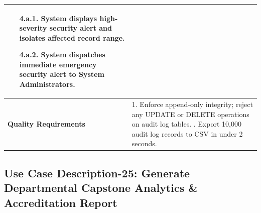 \begin{table}[H]
\begin{tabularx}{\textwidth}{|l|X|}
\begin{itemize}[leftmargin=*]
    \begin{itemize}[leftmargin=*]
        \item[4.a.1.] System displays high-severity security alert and isolates affected record range.
        \item[4.a.2.] System dispatches immediate emergency security alert to System Administrators.
    \end{itemize}
\end{itemize} \\ \hline
\textbf{Quality Requirements} & 
1. Enforce append-only integrity; reject any UPDATE or DELETE operations on audit log tables. \newline
2. Export 10,000 audit log records to CSV in under 2 seconds. \\ \hline
\end{tabularx}
\end{table}

\clearpage
\subsection{Use Case Description-25: Generate Departmental Capstone Analytics \& Accreditation Report}
\label{subsec:uc25}

